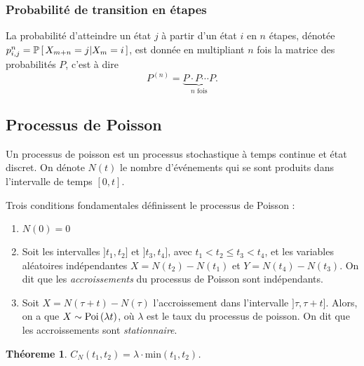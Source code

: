 \documentclass[11pt]{article}
\newcommand\Pg[2]{%
	\ensuremath{%
		\mathbb{P}\left[\,#1\middle\rvert#2\,\right]%
	}%
}%
\newcommand\Poi[1]{%
	\ensuremath{%
		\mathrm{Poi}\left(#1\right)%
	}%
}%
\newtheorem{theoreme}{Théoreme}[section]
\begin{document}
\subsubsection{Probabilité de transition en  étapes}
La probabilité d'atteindre un état $j$ à partir d'un état $i$ en $n$ étapes,
dénotée $p_{i,j}^n=\Pg{X_{m+n}=j}{X_m=i}$, est donnée en multipliant $n$ fois
la matrice des probabilités $P$, c'est à dire
\begin{equation*}
	P^{(n)}=\underbrace{P\cdot P\cdots P}_{\text{$n$ fois}}.
\end{equation*}

% 
%
%
%

\subsection{Processus de Poisson}
\begin{definition}
	Un processus de poisson est un processus stochastique à temps continue et
	état discret. On dénote $N(t)$ le nombre d'événements qui se sont produits
	dans l'intervalle de temps $[0,t]$.

	Trois conditions fondamentales définissent le processus de Poisson :
	\begin{enumerate}
		\item $N(0)=0$
		\item Soit les intervalles $]t_1,t_2]$ et $]t_3,t_4]$, avec
		      $t_1<t_2\leq t_3<t_4$, et les variables aléatoires indépendantes
			  $X=N(t_2)-N(t_1)$ et $Y=N(t_4)-N(t_3)$. On dit que les
			  \textit{accroissements} du processus de Poisson sont
			  indépendants.
		\item Soit $X=N(\tau+t)-N(\tau)$ l'accroissement dans l'intervalle
		      $]\tau,\tau+t]$. Alors, on a que $X\sim\Poi{\lambda t}$, où
			  $\lambda$ est le taux du processus de poisson. On dit que les
			  accroissements sont \textit{stationnaire}.
	\end{enumerate}
\end{definition}

\begin{theoreme}
	$C_N(t_1,t_2)=\lambda\cdot\text{min}(t_1,t_2)$.
\end{theoreme}
\end{document}
